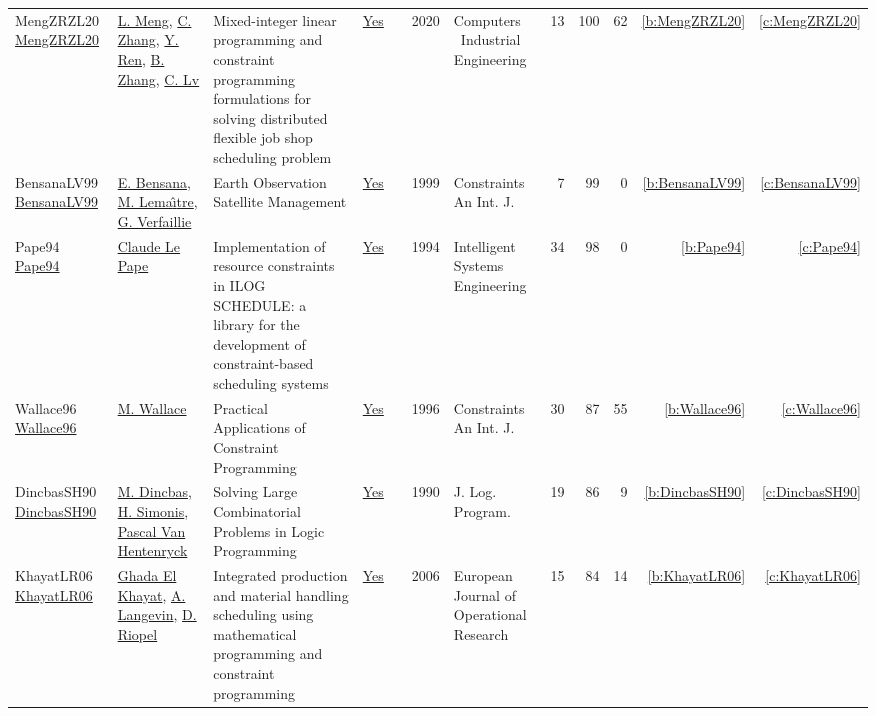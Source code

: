 {\begin{longtable}{>{\raggedright\arraybackslash}p{3cm}>{\raggedright\arraybackslash}p{6cm}>{\raggedright\arraybackslash}p{6.5cm}rrrp{2.5cm}rrrrr}
MengZRZL20 \href{https://doi.org/10.1016/j.cie.2020.106347}{MengZRZL20} & \hyperref[auth:a507]{L. Meng}, \hyperref[auth:a508]{C. Zhang}, \hyperref[auth:a509]{Y. Ren}, \hyperref[auth:a510]{B. Zhang}, \hyperref[auth:a511]{C. Lv} & Mixed-integer linear programming and constraint programming formulations for solving distributed flexible job shop scheduling problem & \href{../works/MengZRZL20.pdf}{Yes} & \cite{MengZRZL20} & 2020 & Computers \  Industrial Engineering & 13 & 100 & 62 & \ref{b:MengZRZL20} & \ref{c:MengZRZL20}\\
BensanaLV99 \href{https://doi.org/10.1023/A:1026488509554}{BensanaLV99} & \hyperref[auth:a173]{E. Bensana}, \hyperref[auth:a174]{M. Lema{\^{\i}}tre}, \hyperref[auth:a175]{G. Verfaillie} & Earth Observation Satellite Management & \href{../works/BensanaLV99.pdf}{Yes} & \cite{BensanaLV99} & 1999 & Constraints An Int. J. & 7 & 99 & 0 & \ref{b:BensanaLV99} & \ref{c:BensanaLV99}\\
Pape94 \href{http://dx.doi.org/10.1049/ise.1994.0009}{Pape94} & \hyperref[auth:a165]{Claude Le Pape} & Implementation of resource constraints in ILOG SCHEDULE: a library for the development of constraint-based scheduling systems & \href{../works/Pape94.pdf}{Yes} & \cite{Pape94} & 1994 & Intelligent Systems Engineering & 34 & 98 & 0 & \ref{b:Pape94} & \ref{c:Pape94}\\
Wallace96 \href{https://doi.org/10.1007/BF00143881}{Wallace96} & \hyperref[auth:a117]{M. Wallace} & Practical Applications of Constraint Programming & \href{../works/Wallace96.pdf}{Yes} & \cite{Wallace96} & 1996 & Constraints An Int. J. & 30 & 87 & 55 & \ref{b:Wallace96} & \ref{c:Wallace96}\\
DincbasSH90 \href{https://doi.org/10.1016/0743-1066(90)90052-7}{DincbasSH90} & \hyperref[auth:a726]{M. Dincbas}, \hyperref[auth:a17]{H. Simonis}, \hyperref[auth:a149]{Pascal Van Hentenryck} & Solving Large Combinatorial Problems in Logic Programming & \href{../works/DincbasSH90.pdf}{Yes} & \cite{DincbasSH90} & 1990 & J. Log. Program. & 19 & 86 & 9 & \ref{b:DincbasSH90} & \ref{c:DincbasSH90}\\
KhayatLR06 \href{https://doi.org/10.1016/j.ejor.2005.02.077}{KhayatLR06} & \hyperref[auth:a654]{Ghada El Khayat}, \hyperref[auth:a655]{A. Langevin}, \hyperref[auth:a656]{D. Riopel} & Integrated production and material handling scheduling using mathematical programming and constraint programming & \href{../works/KhayatLR06.pdf}{Yes} & \cite{KhayatLR06} & 2006 & European Journal of Operational Research & 15 & 84 & 14 & \ref{b:KhayatLR06} & \ref{c:KhayatLR06}\\

\end{longtable}}
